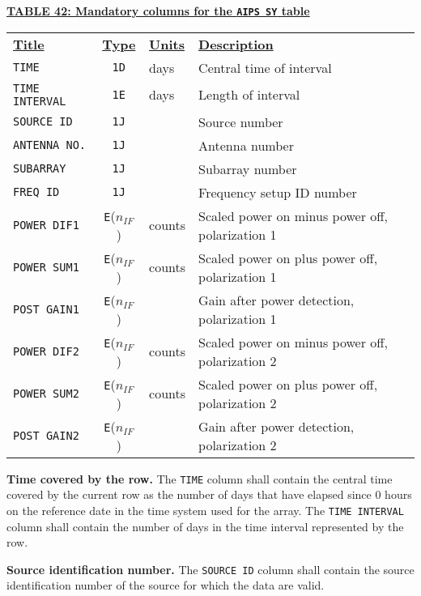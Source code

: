 \documentclass[twoside]{article}
\newcommand{\nif}{$n_{IF}$}
\begin{document}
\begin{center}
\underline{\bf{TABLE 42: Mandatory columns for the {\tt AIPS SY} table}}\\
\begin{tabular}{lcll}
\noalign{\vspace{2pt}} \label{ta:SYcols}
\underline{{\bf Title\vphantom{y}}} & \underline{\bf{Type}} &
   \underline{{\bf Units\vphantom{y}}} & \underline{\bf{Description}} \\
\noalign{\vspace{2pt}}
{\tt TIME}          & {\tt 1D} & days & Central time of interval \\
{\tt TIME INTERVAL} & {\tt 1E} & days & Length of interval \\
{\tt SOURCE ID}     & {\tt 1J} &      & Source number \\
{\tt ANTENNA NO.}   & {\tt 1J} &      & Antenna number \\
{\tt SUBARRAY}      & {\tt 1J} &      & Subarray number \\
{\tt FREQ ID}       & {\tt 1J} &      & Frequency setup ID number \\
{\tt POWER DIF1}    & {\tt E}(\nif) & counts & Scaled power on minus power off, polarization 1\\
{\tt POWER SUM1}    & {\tt E}(\nif) & counts & Scaled power on plus power off, polarization 1 \\
{\tt POST GAIN1}    & {\tt E}(\nif) &  & Gain after power detection, polarization 1 \\
\hline
{\tt POWER DIF2}    & {\tt E}(\nif) & counts & Scaled power on minus power off, polarization 2\\
{\tt POWER SUM2}    & {\tt E}(\nif) & counts & Scaled power on plus power off, polarization 2 \\
{\tt POST GAIN2}    & {\tt E}(\nif) &  & Gain after power detection, polarization 2
\end{tabular}
\end{center}

{\bf Time covered by the row.}  The {\tt TIME} column shall contain
the central time covered by the current row as the number of days
that have elapsed since 0 hours on the reference date in the time
system used for the array.  The {\tt TIME INTERVAL} column shall
contain the number of days in the time interval represented by the
row.

{\bf Source identification number.}  The {\tt SOURCE ID} column shall
contain the source identification number of the source for which the
data are valid.
\end{document}
